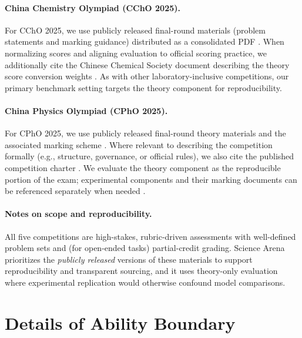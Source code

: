 \documentclass[11pt]{article}
\begin{document}
\paragraph{China Chemistry Olympiad (CChO 2025).}
For CChO 2025, we use publicly released final-round materials (problem statements and marking guidance) distributed as a consolidated PDF \citep{ccho2025_final_theory_paper_public_pdf}. When normalizing scores and aligning evaluation to official scoring practice, we additionally cite the Chinese Chemical Society document describing the theory score conversion weights \citep{ccho2025_theory_weighting_chemsoc}. As with other laboratory-inclusive competitions, our primary benchmark setting targets the theory component for reproducibility.

\paragraph{China Physics Olympiad (CPhO 2025).}
For CPhO 2025, we use publicly released final-round theory materials and the associated marking scheme \citep{cpho2025_final_theory_paper_public_pdf,cpho2025_final_theory_solution_marking_public_pdf}. Where relevant to describing the competition formally (e.g., structure, governance, or official rules), we also cite the published competition charter \citep{cpho_charter_2025_revision}. We evaluate the theory component as the reproducible portion of the exam; experimental components and their marking documents can be referenced separately when needed \citep{cpho2025_final_practical_paper_public_pdf,cpho2025_final_practical_answer_key_public_pdf}.

\paragraph{Notes on scope and reproducibility.}
All five competitions are high-stakes, rubric-driven assessments with well-defined problem sets and (for open-ended tasks) partial-credit grading. Science Arena prioritizes the \emph{publicly released} versions of these materials to support reproducibility and transparent sourcing, and it uses theory-only evaluation where experimental replication would otherwise confound model comparisons.



\section{Details of Ability Boundary}
\label{sec:append-ability}
\end{document}
